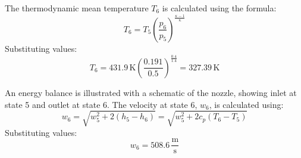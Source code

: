 The thermodynamic mean temperature \( T_6 \) is calculated using the formula:  
\[
T_6 = T_5 \left( \frac{p_6}{p_5} \right)^{\frac{\kappa - 1}{\kappa}}
\]  
Substituting values:  
\[
T_6 = 431.9 \, \text{K} \left( \frac{0.191}{0.5} \right)^{\frac{0.4}{1.4}} = 327.39 \, \text{K}
\]  

An energy balance is illustrated with a schematic of the nozzle, showing inlet at state 5 and outlet at state 6. The velocity at state 6, \( w_6 \), is calculated using:  
\[
w_6 = \sqrt{w_5^2 + 2 \left( h_5 - h_6 \right)} = \sqrt{w_5^2 + 2 c_p \left( T_6 - T_5 \right)}
\]  
Substituting values:  
\[
w_6 = 508.6 \, \frac{\text{m}}{\text{s}}
\]